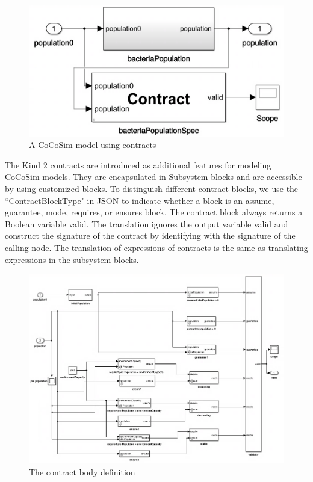 \documentclass{article}
\begin{document}
\begin{figure}[h]
\begin{center}
  \includegraphics[scale=0.2]{figures/contract}    
\end{center}  
  \caption{A CoCoSim model using contracts}
  \label{contractmodel}
\end{figure}


The Kind 2 contracts are introduced as additional features for modeling CoCoSim models.
They are encapsulated in \textsf{Subsystem} blocks and are accessible by using customized 
blocks.
To distinguish different contract blocks, we use the \textsf{``ContractBlockType"} in JSON to indicate whether a block 
is an \textsf{assume}, \textsf{guarantee}, \textsf{mode}, \textsf{requires}, or \textsf{ensures} block.
The contract block always returns a Boolean variable \textsf{valid}.
The translation ignores the output variable \textsf{valid} and construct the signature 
of the contract by identifying with the signature of the calling node.
The translation of expressions of contracts is the same as translating expressions in the subsystem blocks.

\begin{figure}[h]
\begin{center}
  \includegraphics[scale=0.5]{figures/contract1}    
\end{center}  
  \caption{The contract body definition}
  \label{contractdef}
\end{figure}
\end{document}

